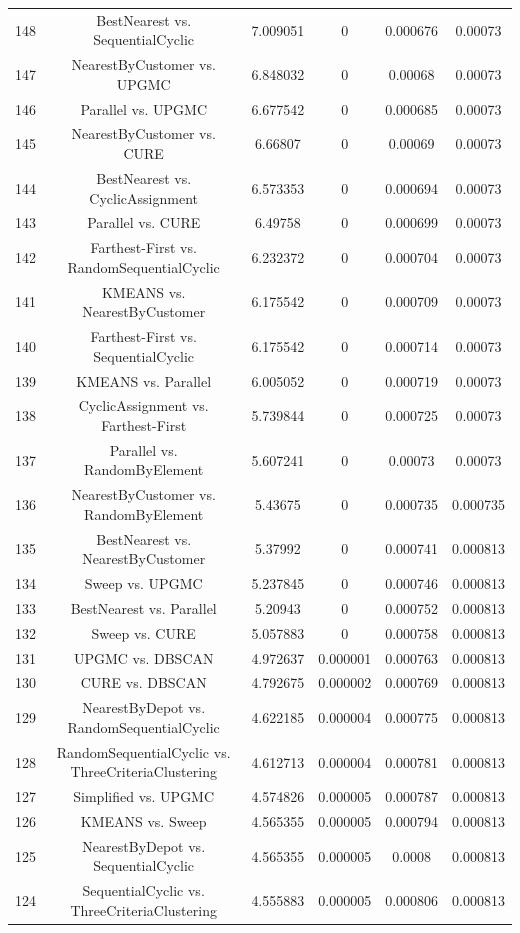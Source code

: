 \documentclass[a4paper,10pt]{article}
\begin{document}
\begin{landscape}
\begin{table}[!htp]
\begin{tabular}{cccccc}
148&BestNearest vs. SequentialCyclic&7.009051&0&0.000676&0.00073\\
147&NearestByCustomer vs. UPGMC&6.848032&0&0.00068&0.00073\\
146&Parallel vs. UPGMC&6.677542&0&0.000685&0.00073\\
145&NearestByCustomer vs. CURE&6.66807&0&0.00069&0.00073\\
144&BestNearest vs. CyclicAssignment&6.573353&0&0.000694&0.00073\\
143&Parallel vs. CURE&6.49758&0&0.000699&0.00073\\
142&Farthest-First vs. RandomSequentialCyclic&6.232372&0&0.000704&0.00073\\
141&KMEANS vs. NearestByCustomer&6.175542&0&0.000709&0.00073\\
140&Farthest-First vs. SequentialCyclic&6.175542&0&0.000714&0.00073\\
139&KMEANS vs. Parallel&6.005052&0&0.000719&0.00073\\
138&CyclicAssignment vs. Farthest-First&5.739844&0&0.000725&0.00073\\
137&Parallel vs. RandomByElement&5.607241&0&0.00073&0.00073\\
136&NearestByCustomer vs. RandomByElement&5.43675&0&0.000735&0.000735\\
135&BestNearest vs. NearestByCustomer&5.37992&0&0.000741&0.000813\\
134&Sweep vs. UPGMC&5.237845&0&0.000746&0.000813\\
133&BestNearest vs. Parallel&5.20943&0&0.000752&0.000813\\
132&Sweep vs. CURE&5.057883&0&0.000758&0.000813\\
131&UPGMC vs. DBSCAN&4.972637&0.000001&0.000763&0.000813\\
130&CURE vs. DBSCAN&4.792675&0.000002&0.000769&0.000813\\
129&NearestByDepot vs. RandomSequentialCyclic&4.622185&0.000004&0.000775&0.000813\\
128&RandomSequentialCyclic vs. ThreeCriteriaClustering&4.612713&0.000004&0.000781&0.000813\\
127&Simplified vs. UPGMC&4.574826&0.000005&0.000787&0.000813\\
126&KMEANS vs. Sweep&4.565355&0.000005&0.000794&0.000813\\
125&NearestByDepot vs. SequentialCyclic&4.565355&0.000005&0.0008&0.000813\\
124&SequentialCyclic vs. ThreeCriteriaClustering&4.555883&0.000005&0.000806&0.000813\\

\end{tabular}
\end{table}
\end{landscape}
\end{document}
